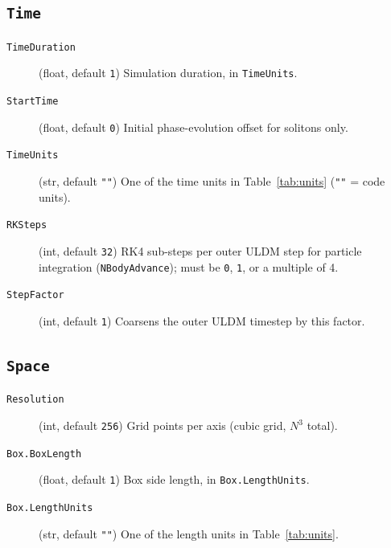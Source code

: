 \documentclass[11pt]{article}
\newcommand{\code}[1]{\texttt{#1}}
\newcommand{\field}[1]{\texttt{#1}}
\begin{document}
\subsection{\field{Time}}
\begin{description}
  \item[\field{TimeDuration}] (float, default \code{1}) Simulation duration,
    in \field{TimeUnits}.
  \item[\field{StartTime}] (float, default \code{0}) Initial phase-evolution
    offset for solitons only.
  \item[\field{TimeUnits}] (str, default \code{""}) One of the time units in
    Table~\ref{tab:units} (\code{""} = code units).
  \item[\field{RKSteps}] (int, default \code{32}) RK4 sub-steps per outer ULDM
    step for particle integration (\code{NBodyAdvance}); must be \code{0},
    \code{1}, or a multiple of 4.
  \item[\field{StepFactor}] (int, default \code{1}) Coarsens the outer ULDM
    timestep by this factor.
\end{description}

\subsection{\field{Space}}
\begin{description}
  \item[\field{Resolution}] (int, default \code{256}) Grid points per axis
    (cubic grid, $N^3$ total).
  \item[\field{Box.BoxLength}] (float, default \code{1}) Box side length, in
    \field{Box.LengthUnits}.
  \item[\field{Box.LengthUnits}] (str, default \code{""}) One of the length
    units in Table~\ref{tab:units}.
\end{description}
\end{document}
